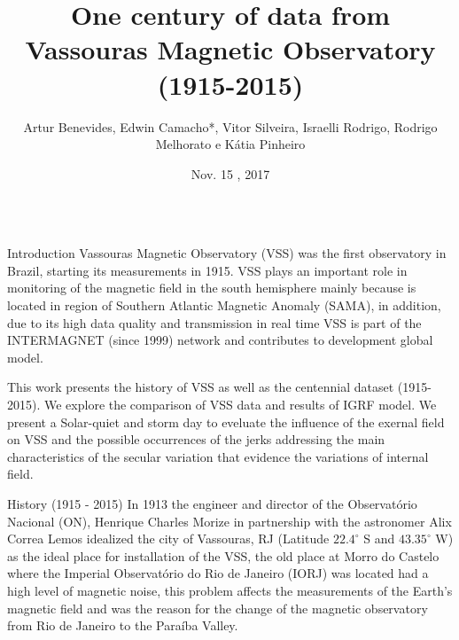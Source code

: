 \documentclass[final,t]{beamer}
\title{\huge One century of data from Vassouras Magnetic Observatory (1915-2015)}
\author[Benevides, Bassrei]{Artur Benevides, Edwin Camacho*, Vitor Silveira, Israelli Rodrigo, Rodrigo Melhorato e Kátia Pinheiro}
\institute[ON-MCTIC]{Observatório Nacional}
\date[Nov , 2017]{Nov. 15 , 2017}
\begin{document}
  \begin{columns}[t]
    \begin{column}{.66\linewidth}

\begin{block}{Introduction}
\justifying	
 Vassouras Magnetic Observatory (VSS) was the first observatory in Brazil, starting its measurements in 1915. VSS plays an important role in monitoring of the magnetic field in the south hemisphere mainly because is located in region of Southern Atlantic Magnetic Anomaly (SAMA), in addition, due to its high data quality and transmission in real time VSS is part of the INTERMAGNET (since 1999) network and contributes to development global model.
 
 This work presents the history of VSS as well as the centennial dataset (1915-2015). We	explore the comparison of VSS data and results of IGRF model. We present a Solar-quiet and storm day to eveluate the influence of the exernal field on VSS and the possible occurrences of the jerks addressing the main characteristics of the secular variation that evidence the variations of internal field.	
		

	
\end{block}

\begin{block}{History (1915 - 2015)}
	\justifying	
In 1913 the engineer and director of the Observatório Nacional (ON), Henrique Charles Morize in partnership with the astronomer Alix Correa Lemos idealized the city of Vassouras, RJ (Latitude $22.4 ^{\circ}$ S and $43.35 ^{\circ}$ W) as the ideal place for installation of the VSS, the old place at Morro do Castelo where the Imperial Observatório do Rio de Janeiro (IORJ) was located had a high level of magnetic noise, this problem affects the measurements of the Earth's magnetic field and was the reason for the change of the magnetic observatory from Rio de Janeiro to the Paraíba Valley.  
	
	
	
\end{block}


\begin{columns}
	\begin{column}{.31\linewidth}
	

\end{column}
\end{columns}
\end{column}
\end{columns}
\end{document}

